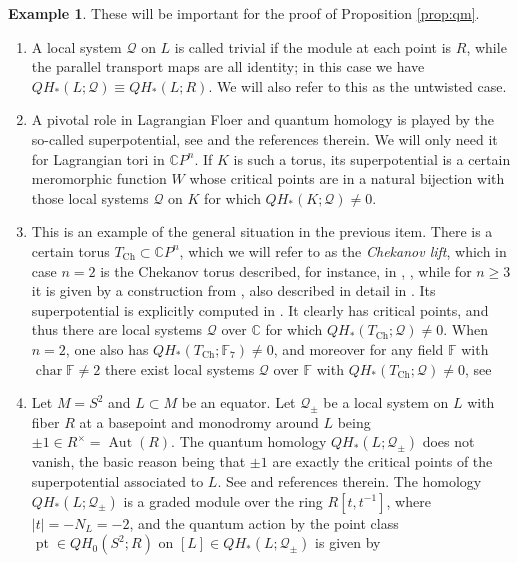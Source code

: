 \documentclass[11pt%
]{article}
\theoremstyle{definition}
\newtheorem{exam}[thm]{Example}
\newcommand{\F}{{\mathbb{F}}}
\newcommand{\C}{{\mathbb{C}}}
\newcommand{\cQ}{{\mathcal{Q}}}
\DeclareMathOperator{\chr}{char}
\DeclareMathOperator{\pt}{pt}
\DeclareMathOperator{\Aut}{Aut}
\DeclareMathOperator{\0}{\operatorname{\mathbf{0}}}
\begin{document}
\begin{exam}\label{ex:loc_sys_quantum_action}
  These will be important for the proof of Proposition \ref{prop:qm}.
  \begin{enumerate}
    \item A local system $\cQ$ on $L$ is called trivial if the module at each point is $R$, while the parallel transport maps are all identity; in this case we have $QH_*(L;\cQ)\equiv QH_*(L;R)$. We will also refer to this as the untwisted case.
    \item A pivotal role in Lagrangian Floer and quantum homology is played by the so-called superpotential, see \cite{Biran_Cornea_Lag_Top_Enumerative_Geom} and the references therein. We will only need it for Lagrangian tori in $\C P^n$. If $K$ is such a torus, its superpotential is a certain meromorphic function $W$ whose critical points are in a natural bijection with those local systems $\cQ$ on $K$ for which $QH_*(K;\cQ)\neq 0$.
    \item This is an example of the general situation in the previous item. There is a certain torus $T_{\mathrm{Ch}}\subset \C P^n$, which we will refer to as the \emph{Chekanov lift}, which in case $n=2$ is the Chekanov torus described, for instance, in \cite{Chekanov_Schlenk_Notes_Monotone_Twist_Tori}, \cite{Auroux_Mirror_Symm_T_Duality_Compl_Antican_Divisor}, while for $n\geq 3$ it is given by a construction from \cite{Chanda_Hirschi_Wang_Infinitely_Exotic_Lag_Tori_Higher_Projective_Spaces}, also described in detail in \cite{Kawamoto_Shelukhin_Spectral_Invts_Over_Integers}. Its superpotential is explicitly computed in \cite[Example 4.2]{Chanda_Hirschi_Wang_Infinitely_Exotic_Lag_Tori_Higher_Projective_Spaces}. It clearly has critical points, and thus there are local systems $\cQ$ over $\C$ for which $QH_*(T_{\mathrm{Ch}};\cQ)\neq 0$. When $n=2$, one also has $QH_*(T_{\mathrm{Ch}};\F_7)\neq 0$, and moreover for any field $\F$ with $\chr \F\neq 2$ there exist local systems $\cQ$ over $\F$ with $QH_*(T_{\mathrm{Ch}};\cQ)\neq 0$, see \cite[Section 2.6]{leclercq2018spectral}
    \item Let $M=S^2$ and $L\subset M$ be an equator. Let $\cQ_\pm$ be a local system on $L$ with fiber $R$ at a basepoint and monodromy around $L$ being $\pm1\in R^\times=\Aut(R)$. The quantum homology $QH_*(L;\cQ_\pm)$ does not vanish, the basic reason being that $\pm1$ are exactly the critical points of the superpotential associated to $L$. See \cite{Biran_Cornea_Lag_Top_Enumerative_Geom} and references therein. The homology $QH_*(L;\cQ_\pm)$ is a graded module over the ring $R[t,t^{-1}]$, where $|t|=-N_L=-2$, and the quantum action by the point class $\pt \in QH_0(S^2;R)$ on $[L] \in QH_*(L;\cQ_\pm)$ is given by

\end{enumerate}
\end{exam}
\end{document}
